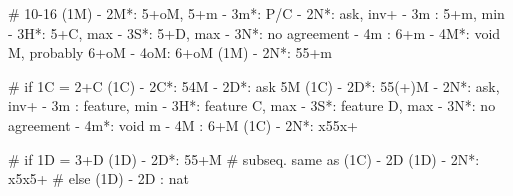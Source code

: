 # 10-16
(1M) - 2M*: 5+oM, 5+m
          - 3m*: P/C
          - 2N*: ask, inv+
               - 3m : 5+m, min
               - 3H*: 5+C, max
               - 3S*: 5+D, max
               - 3N*: no agreement
               - 4m : 6+m
               - 4M*: void M, probably 6+oM
               - 4oM: 6+oM
(1M) - 2N*: 55+m

# if 1C = 2+C
(1C) - 2C*: 54M
          - 2D*: ask 5M
(1C) - 2D*: 55(+)M 
          - 2N*: ask, inv+
               - 3m : feature, min
               - 3H*: feature C, max
               - 3S*: feature D, max
               - 3N*: no agreement
               - 4m*: void m
               - 4M : 6+M
(1C) - 2N*: x55x+

# if 1D = 3+D
(1D) - 2D*: 55+M  # subseq. same as (1C) - 2D
(1D) - 2N*: x5x5+
# else
(1D) - 2D : nat 

